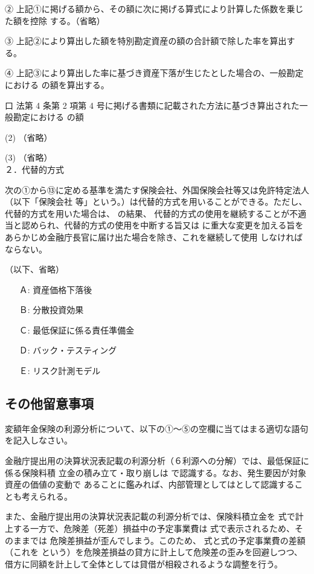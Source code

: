 \documentclass[report,gutter=10mm,fore-edge=10mm,uplatex,dvipdfmx]{jlreq}
\begin{document}
{② 上記①に掲げる額から、その額に次に掲げる算式により計算した係数を乗じた額を控除
する。（省略）

③ 上記②により算出した額を特別勘定資産の額の合計額で除した率を算出する。

④ 上記③により算出した率に基づき資産下落が生じたとした場合の、一般勘定における
の額を算出する。

口 法第 4 条第 2 項第 4 号に掲げる書類に記載された方法に基づき算出された一般勘定における
の額

(2) （省略）

(3) （省略）\\
２．代替的方式

次の①から⑬に定める基準を満たす保険会社、外国保険会社等又は免許特定法人（以下「保険会社
等」という。）は代替的方式を用いることができる。ただし、代替的方式を用いた場合は、
の結果、
代替的方式の使用を継続することが不適当と認められ、代替的方式の使用を中断する旨又は
に重大な変更を加える旨をあらかじめ金融庁長官に届け出た場合を除き、これを継続して使用
しなければならない。

（以下、省略）
\answer{}
\begin{itemize}
 \item[Ａ: ] 資産価格下落後
 \item[Ｂ: ] 分散投資効果
 \item[Ｃ: ] 最低保証に係る責任準備金
 \item[Ｄ: ] バック・テスティング
 \item[Ｅ: ] リスク計測モデル
\end{itemize}
\subsection{その他留意事項}
変額年金保険の利源分析について、以下の①～⑤の空欄に当てはまる適切な語句を記入しなさい。

金融庁提出用の決算状況表記載の利源分析（６利源への分解）では、最低保証に係る保険料積
立金の積み立て・取り崩しは
で認識する。なお、発生要因が対象資産の価値の変動で
あることに鑑みれば、内部管理としてはとして認識することも考えられる。

また、金融庁提出用の決算状況表記載の利源分析では、保険料積立金を
式で計上する一方で、危険差（死差）損益中の予定事業費は
式で表示されるため、そのままでは
危険差損益が歪んでしまう。このため、
式と式の予定事業費の差額（これを
という）を危険差損益の貸方に計上して危険差の歪みを回避しつつ、
借方に同額を計上して全体としては貸借が相殺されるような調整を行う。

}
\end{document}
